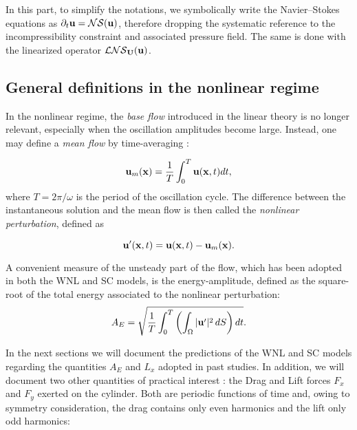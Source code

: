 \documentclass[twocolumn,10pt]{asme2ej}
\newcommand{\be}[1]{ \begin{equation} \label{#1}}
\newcommand{\ee}{\end{equation}}
\begin{document}
 In this part, to simplify the notations, we symbolically write the Navier--Stokes equations as $\partial_t {\bf u} = {\cal NS} ({\bf u})$, therefore dropping the systematic reference to the incompressibility constraint and associated pressure field. The same is done with the linearized operator ${\cal LNS}_{{\bf U}}( {\bf u})$. 

\subsection{General definitions in the nonlinear regime}



In the nonlinear regime, the {\em base flow} introduced in the linear theory is no longer relevant, especially when the oscillation amplitudes become large. 
Instead, one may define a {\em mean flow} by time-averaging : 

\be{defumean}
{\bf u}_m({\bf x})  = \frac{1}{T} \int_0^{T}  {\bf u}({\bf x},t)  dt,
\ee
where $T = 2\pi/\omega$  is the period of the oscillation cycle. The difference between the instantaneous solution and the mean flow is then called the {\em nonlinear perturbation}, defined as 

\be{defuprime}
{\bf u}'({\bf x},t) =   {\bf u}({\bf x},t)-  {\bf u}_m({\bf x}).
\ee

A convenient measure of the unsteady part of the flow, which has been adopted in both the WNL and SC models, is the energy-amplitude, defined as the square-root of the total energy associated to the nonlinear perturbation:
\be{defAnergy}
A_E = \sqrt{\frac{1}{T} \int_0^{T} \left( \int_\Omega | {\bf u}' |^2 \, dS \right) dt}.
\ee

In the next sections we will document the predictions of the WNL and SC models regarding the quantities $A_E$ and $L_x$ adopted in past studies. In addition, we will document two other quantities of practical interest : the Drag and Lift forces $F_x$ and $F_y$ exerted on the cylinder. 
Both are periodic functions of time and, owing to symmetry consideration, the drag contains only even harmonics and the lift only odd harmonics:
\end{document}
